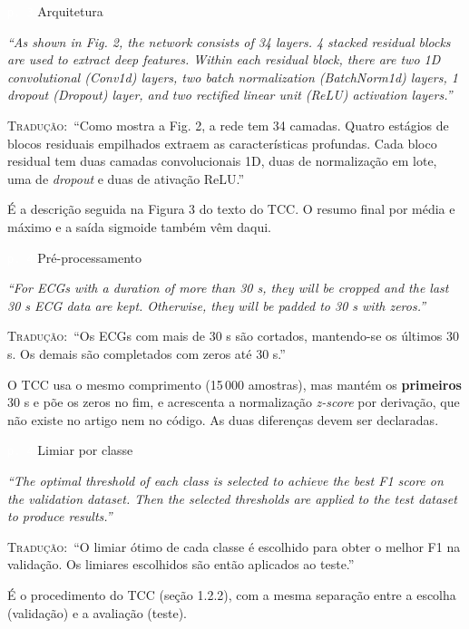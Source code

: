 \documentclass[11pt,a4paper]{article}
\newcommand{\pagechip}[1]{{\setlength{\fboxsep}{1.5pt}\colorbox{cAcc}{\textcolor{white}{\scriptsize\texttt{#1}}}}}
\newenvironment{origquote}{\par\itshape\small}{\par}
\newenvironment{tradquote}{\par\small\textsc{Tradução:}\ }{\par}
\newcommand{\explab}[1]{\par\smallskip{\small\color{cAcc}\textbf{\MakeUppercase{#1}}}\par}
\begin{document}
\begin{citacard}{\pagechip{p. 3} Arquitetura}
\begin{origquote}“As shown in Fig. 2, the network consists of 34 layers. 4 stacked residual blocks are used to extract deep features. Within each residual block, there are two 1D convolutional (Conv1d) layers, two batch normalization (BatchNorm1d) layers, 1 dropout (Dropout) layer, and two rectified linear unit (ReLU) activation layers.”\end{origquote}
\begin{tradquote}“Como mostra a Fig. 2, a rede tem 34 camadas. Quatro estágios de blocos residuais empilhados extraem as características profundas. Cada bloco residual tem duas camadas convolucionais 1D, duas de normalização em lote, uma de \textit{dropout} e duas de ativação ReLU.”\end{tradquote}
\explab{Explicação}
É a descrição seguida na Figura 3 do texto do TCC. O resumo final por média e máximo e a saída sigmoide também vêm daqui.
\end{citacard}

\begin{citacard}{\pagechip{p. 4} Pré-processamento}
\begin{origquote}“For ECGs with a duration of more than 30 s, they will be cropped and the last 30 s ECG data are kept. Otherwise, they will be padded to 30 s with zeros.”\end{origquote}
\begin{tradquote}“Os ECGs com mais de 30 s são cortados, mantendo-se os últimos 30 s. Os demais são completados com zeros até 30 s.”\end{tradquote}
\explab{Explicação}
O TCC usa o mesmo comprimento (15\,000 amostras), mas mantém os \textbf{primeiros} 30 s e põe os zeros no fim, e acrescenta a normalização \textit{z-score} por derivação, que não existe no artigo nem no código. As duas diferenças devem ser declaradas.
\end{citacard}

\begin{citacard}{\pagechip{p. 4} Limiar por classe}
\begin{origquote}“The optimal threshold of each class is selected to achieve the best F1 score on the validation dataset. Then the selected thresholds are applied to the test dataset to produce results.”\end{origquote}
\begin{tradquote}“O limiar ótimo de cada classe é escolhido para obter o melhor F1 na validação. Os limiares escolhidos são então aplicados ao teste.”\end{tradquote}
\explab{Explicação}
É o procedimento do TCC (seção 1.2.2), com a mesma separação entre a escolha (validação) e a avaliação (teste).
\end{citacard}
\end{document}
